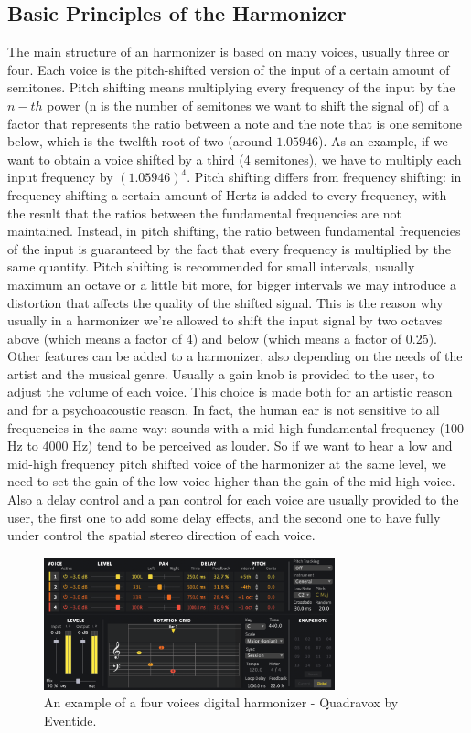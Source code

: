 \documentclass{article}
\begin{document}
\subsection{Basic Principles of the Harmonizer}
The main structure of an harmonizer is based on many voices, usually three or four. Each voice is the pitch-shifted version of the input of a certain amount of semitones. Pitch shifting means multiplying every frequency of the input by the $n-th$ power (n is the number of semitones we want to shift the signal of) of a factor that represents the ratio between a note and the note that is one semitone below, which is the twelfth root of two  (around $1.05946$). As an example, if we want to obtain a voice shifted by a third (4 semitones), we have to multiply each input frequency by $(1.05946)^4$.
Pitch shifting differs from frequency shifting: in frequency shifting a certain amount of Hertz is added to every frequency, with the result that the ratios between the fundamental frequencies are not maintained. Instead, in pitch shifting, the ratio between fundamental frequencies of the input is guaranteed by the fact that every frequency is multiplied by the same quantity.
Pitch shifting is recommended for small intervals, usually maximum an octave or a little bit more, for bigger intervals we may introduce a distortion that affects the quality of the shifted signal. This is the reason why usually in a harmonizer we’re allowed to shift the input signal by two octaves above (which means a factor of 4) and below (which means a factor of 0.25).
Other features can be added to a harmonizer, also depending on the needs of the artist and the musical genre. Usually a gain knob is provided to the user, to adjust the volume of each voice. This choice is made both for an artistic reason and for a psychoacoustic reason. In fact, the human ear is not sensitive to all frequencies in the same way: sounds with a mid-high fundamental frequency (100 Hz to 4000 Hz) tend to be perceived as louder. So if we want to hear a low and mid-high frequency pitch shifted voice of the harmonizer at the same level, we need to set the gain of the low voice higher than the gain of the mid-high voice.
Also a delay control and a pan control for each voice are usually provided to the user, the first one to add some delay effects, and the second one to have fully under control the spatial stereo direction of each voice.

\begin{figure}[H]
\centering
 \includegraphics[width=0.75\textwidth]{quadravox.png}
  \caption{An example of a four voices digital harmonizer - Quadravox by Eventide.}
\end{figure}
\end{document}
